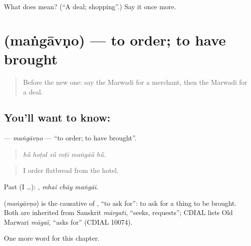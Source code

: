 \begin{tcolorbox}[breakable,colback=teal!4,colframe=teal!35!black,title={Before you move on}]
What does  mean? (\textquotedblleft{}A deal; shopping\textquotedblright{}.) Say it once more.
\end{tcolorbox}
\section[\texorpdfstring{\mw{मंगावणो} (maṅgāvṇo)}{मंगावणो (maṅgāvṇo)}]{ (maṅgāvṇo) — to order; to have brought}

\label{lesson:MW-C209-mangavno}



\begin{quote}
Before the new one: say the Marwadi for a merchant, then the Marwadi for a deal.
\end{quote}

\subsection*{You'll want to know: }
\textbf{} — \emph{maṅgāvṇo} — \textquotedblleft{}to order; to have brought\textquotedblright{}.

\begin{quote}
     
\end{quote}

\begin{quote}
\emph{hū̃ hoṭal sū̃ roṭī maṅgāū̃ hū̃.}
\end{quote}

\begin{quote}
I order flatbread from the hotel.
\end{quote}

Past (I …):   , \emph{mhaĩ chāy maṅgāī}.

\begin{cousinweb}
\textbf{} (\emph{maṅgāvṇo}) is the causative of \textbf{}, \textquotedblleft{}to ask for\textquotedblright{}: to ask for a thing to be brought. Both are inherited from Sanskrit \emph{mārgati}, \textquotedblleft{}seeks, requests\textquotedblright{}; CDIAL lists Old Marwari \emph{māgaï}, \textquotedblleft{}asks for\textquotedblright{} (CDIAL 10074).
\end{cousinweb}

\begin{grammarlens}[title={What you've built}]
One more word for this chapter.
\end{grammarlens}

